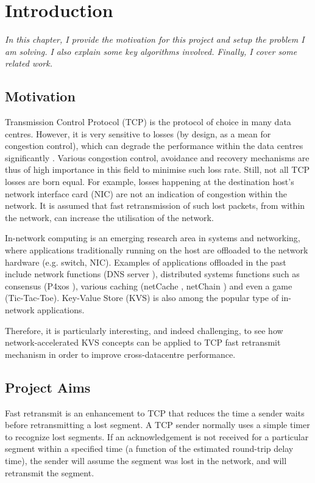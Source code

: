 \chapter{Introduction}
\textit{In this chapter, I provide the motivation for this project and setup the problem I am solving. I also explain some key algorithms involved. Finally, I cover some related work.}

\section{Motivation}
	
 Transmission Control Protocol (TCP) is the protocol of choice in many data centres. However, it is very sensitive to losses (by design, as a mean for congestion control), which can degrade the performance within the data centres significantly \cite{zilberman2017has}. Various congestion control, avoidance and recovery mechanisms are thus of high importance in this field to minimise such loss rate. Still, not all TCP losses are born equal. For example, losses happening at the destination host's network interface card (NIC) are not an indication of congestion within the network. It is assumed that fast retransmission of such lost packets, from within the network, can increase the utilisation of the network.
 
 In-network computing is an emerging research area in systems and networking, where applications traditionally running on the host are offloaded to the network hardware (e.g. switch, NIC). Examples of applications offloaded in the past include network functions (DNS server \cite{dns}), distributed systems functions such as consensus (P4xos \cite{p4xos}), various caching (netCache \cite{netCache}, netChain \cite{netChain}) and even a game (Tic-Tac-Toe). Key-Value Store (KVS) is also among the popular type of in-network applications. 
 
 Therefore, it is particularly interesting, and indeed challenging, to see how network-accelerated KVS concepts can be applied to TCP fast retransmit mechanism in order to improve cross-datacentre performance.
 
\section{Project Aims}
Fast retransmit is an enhancement to TCP that reduces the time a sender waits before retransmitting a lost segment. A TCP sender normally uses a simple timer to recognize lost segments. If an acknowledgement is not received for a particular segment within a specified time (a function of the estimated round-trip delay time), the sender will assume the segment was lost in the network, and will retransmit the segment.

